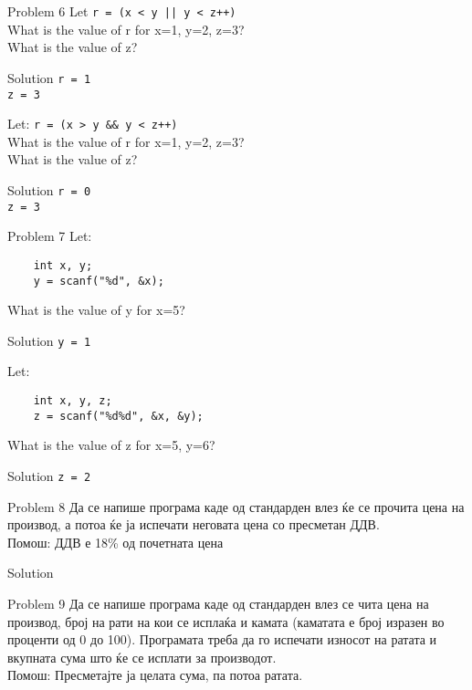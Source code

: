 \begin{frame}[fragile]{Problem 6}
Let \texttt{r = (x < y || y < z++)}\\
	What is the value of r for x=1, y=2, z=3?\\
	What is the value of z?
	\begin{exampleblock}{Solution}
	\texttt{r = 1\\z = 3}
	\end{exampleblock}
Let: \texttt{r = (x > y \&\& y < z++)}\\
	What is the value of r for x=1, y=2, z=3?\\
	What is the value of z?
	\begin{exampleblock}{Solution}
	\texttt{r = 0\\z = 3}
	\end{exampleblock}
\end{frame}

\begin{frame}[fragile]{Problem 7}
Let:
\begin{lstlisting}
	int x, y;
	y = scanf("%d", &x);
\end{lstlisting}
What is the value of y for x=5?
	\begin{exampleblock}{Solution}
	\texttt{y = 1}
	\end{exampleblock}
Let:
\begin{lstlisting}
	int x, y, z;
	z = scanf("%d%d", &x, &y);
\end{lstlisting}
	What is the value of z for x=5, y=6?
	\begin{exampleblock}{Solution}
	\texttt{z = 2}
	\end{exampleblock}
\end{frame}


\begin{frame}[fragile]{Problem 8}
Да се напише програма каде од стандарден влез ќе се прочита цена на производ, а
потоа ќе ја испечати неговата цена со пресметан ДДВ.\\ Помош: ДДВ е 18\% од почетната цена
	\begin{exampleblock}{Solution}
		
	\end{exampleblock}
\end{frame}


\begin{frame}[fragile]{Problem 9}
Да се напише програма каде од стандарден влез се чита цена на производ, број на
рати на кои се исплаќа и камата (каматата е број изразен во проценти од 0 до 100). 
Програмата треба да го испечати износот на ратата и вкупната сума што ќе се исплати за производот.\\
Помош: Пресметајте ја целата сума, па потоа ратата.
\end{frame}

